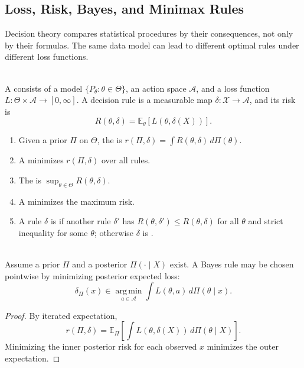 \subsection{Loss, Risk, Bayes, and Minimax Rules}

Decision theory compares statistical procedures by their consequences, not only by their formulas.  The same data model can lead to different optimal rules under different loss functions.

\begin{definition} \label{def:statistical-decision-problem} \\
A  consists of a model $\{P_\theta:\theta\in\Theta\}$, an action space $\mathcal{A}$, and a loss function $L:\Theta\times\mathcal{A}\to[0,\infty]$.  A decision rule is a measurable map $\delta:\mathcal{X}\to\mathcal{A}$, and its risk is
\[
R(\theta,\delta)=\mathbb{E}_\theta[L(\theta,\delta(X))].
\]
\end{definition}

\begin{definition} \label{def:bayes-risk-minimax-admissible} 
\begin{enumerate}[label=(\roman*)]
\setlength{\itemsep}{0pt}
\item Given a prior $\Pi$ on $\Theta$, the  is $r(\Pi,\delta)=\int R(\theta,\delta)\,d\Pi(\theta)$.
\item A  minimizes $r(\Pi,\delta)$ over all rules.
\item The  is $\sup_{\theta\in\Theta}R(\theta,\delta)$.
\item A  minimizes the maximum risk.
\item A rule $\delta$ is  if another rule $\delta'$ has $R(\theta,\delta')\leq R(\theta,\delta)$ for all $\theta$ and strict inequality for some $\theta$; otherwise $\delta$ is .
\end{enumerate}
\end{definition}

\begin{proposition} \label{prop:posterior-risk-bayes-rule} \\
Assume a prior $\Pi$ and a posterior $\Pi(\cdot\mid X)$ exist.  A Bayes rule may be chosen pointwise by minimizing posterior expected loss:
\[
\delta_\Pi(x)\in\operatorname*{arg\,min}_{a\in\mathcal{A}}
\int L(\theta,a)\,d\Pi(\theta\mid x).
\]
\begin{proof}
By iterated expectation,
\[
r(\Pi,\delta)=
\mathbb{E}_{\Pi}\!\left[
\int L(\theta,\delta(X))\,d\Pi(\theta\mid X)
\right].
\]
Minimizing the inner posterior risk for each observed $x$ minimizes the outer expectation.
\end{proof}
\end{proposition}

